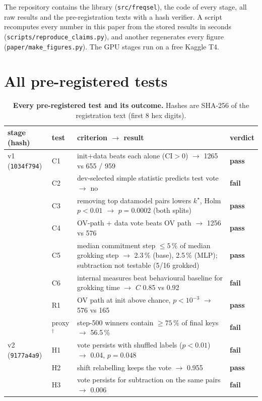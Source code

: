 \documentclass[10pt]{article}
\newcommand{\pass}{\textcolor{green!45!black}{\textbf{pass}}}
\newcommand{\fail}{\textcolor{red!70!black}{\textbf{fail}}}
\begin{document}
The repository contains the library (\texttt{src/freqsel}), the code of every stage, all raw results and the pre-registration
texts with a hash verifier. A script recomputes every number in this paper from the stored results in seconds
(\texttt{scripts/reproduce\_claims.py}), and another regenerates every figure (\texttt{paper/make\_figures.py}). The GPU
stages run on a free Kaggle T4.




\clearpage
\appendix
\section{All pre-registered tests}
\begin{table}[!htbp]\centering\footnotesize
\caption{\textbf{Every pre-registered test and its outcome.} Hashes are SHA-256 of the registration text (first 8 hex digits).}
\label{tab:prereg}
\begin{tabularx}{\linewidth}{@{}l l X l@{}}\toprule
stage (hash) & test & criterion $\to$ result & verdict \\\midrule
v1 (\texttt{1034f794}) & C1 & init+data beats each alone (CI$>0$) $\to$ 1265 vs 655 / 959 & \pass \\
 & C2 & dev-selected simple statistic predicts test vote $\to$ no & \fail \\
 & C3 & removing top datamodel pairs lowers $k^\star$, Holm $p<0.01$ $\to$ $p=0.0002$ (both splits) & \pass \\
 & C4 & OV-path + data vote beats OV path $\to$ 1256 vs 576 & \pass \\
 & C5 & median commitment step $\le5\,\%$ of median grokking step $\to$ 2.3\,\% (base), 2.5\,\% (MLP); subtraction not testable (5/16 grokked) & \pass \\
 & C6 & internal measures beat behavioural baseline for grokking time $\to$ $C$ 0.85 vs 0.92 & \fail \\
 & R1 & OV path at init above chance, $p<10^{-3}$ $\to$ 576 vs 165 & \pass \\
 & proxy$^\dagger$ & step-500 winners contain $\ge75\,\%$ of final keys $\to$ 56.5\,\% & \fail \\
v2 (\texttt{9177a4a9}) & H1 & vote persists with shuffled labels ($p<0.01$) $\to$ 0.04, $p=0.048$ & \fail \\
 & H2 & shift relabelling keeps the vote $\to$ 0.955 & \pass \\
 & H3 & vote persists for subtraction on the same pairs $\to$ 0.006 & \fail \\

\end{tabularx}
\end{table}
\end{document}
